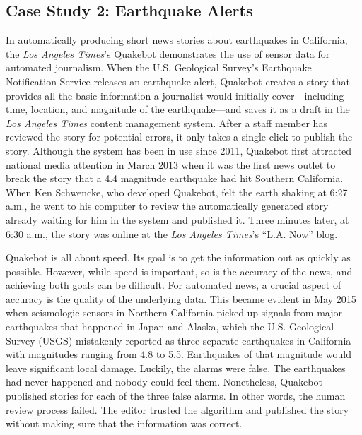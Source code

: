 \documentclass[notoc, symmetric, nobib, nols]{towcenter-guideto-book}
\begin{document}
\subsection{Case Study 2: Earthquake Alerts}
\begin{framed}
In automatically producing short news stories about earthquakes in California, the \textit{Los Angeles Times}'s Quakebot demonstrates the use of sensor data for automated journalism. When the U.S. Geological Survey's Earthquake Notification Service releases an earthquake alert, Quakebot creates a story that provides all the basic information a journalist would initially cover---including time, location, and magnitude of the earthquake---and saves it as a draft in the \textit{Los Angeles Times} content management system. After a staff member has reviewed the story for potential errors, it only takes a single click to publish the story. Although the system has been in use since 2011, Quakebot first attracted national media attention in March 2013 when it was the first news outlet to break the story that a 4.4 magnitude earthquake had hit Southern California. When Ken Schwencke, who developed Quakebot, felt the earth shaking at 6:27 a.m., he went to his computer to review the automatically generated story already waiting for him in the system and published it. Three minutes later, at 6:30 a.m., the story was online at the \textit{Los Angeles Times}'s ``L.A. Now'' blog.\autocite{pluc14}

Quakebot is all about speed. Its goal is to get the information out as quickly as possible. However, while speed is important, so is the accuracy of the news, and achieving both goals can be difficult. For automated news, a crucial aspect of accuracy is the quality of the underlying data. This became evident in May 2015 when seismologic sensors in Northern California picked up signals from major earthquakes that happened in Japan and Alaska, which the U.S. Geological Survey (USGS) mistakenly reported as three separate earthquakes in California with magnitudes ranging from 4.8 to 5.5. Earthquakes of that magnitude would leave significant local damage. Luckily, the alarms were false. The earthquakes had never happened and nobody could feel them. Nonetheless, Quakebot published stories for each of the three false alarms. In other words, the human review process failed. The editor trusted the algorithm and published the story without making sure that the information was correct.\autocite{mercer15}


\end{framed}
\end{document}
